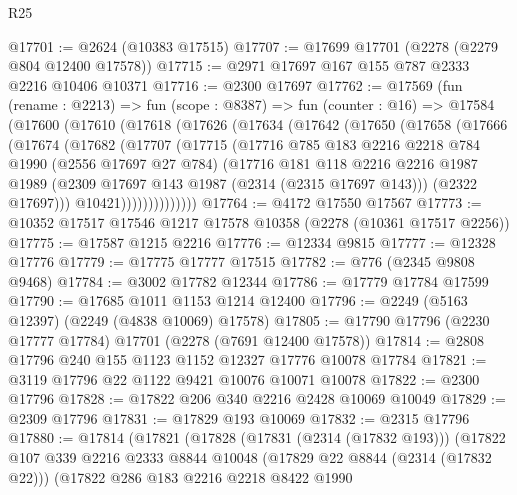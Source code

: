 \begin{lexlean}{R25}
\begin{coremodule}
@17701 := @2624 (@10383 @17515)
@17707 := @17699 @17701 (@2278 (@2279 @804 @12400 @17578))
@17715 := @2971 @17697 @167 @155 @787 @2333 @2216 @10406 @10371
@17716 := @2300 @17697
@17762 := @17569
    (fun (rename : @2213) =>
    fun (scope : @8387) =>
    fun (counter : @16) =>
    @17584
      (@17600
        (@17610
          (@17618
            (@17626
              (@17634
                (@17642
                  (@17650
                    (@17658
                      (@17666
                        (@17674
                          (@17682
                            (@17707
                              (@17715
                                (@17716
                                  @785
                                  @183
                                  @2216
                                  @2218
                                  @784
                                  @1990
                                  (@2556 @17697 @27 @784)
                                  (@17716
                                    @181
                                    @118
                                    @2216
                                    @2216
                                    @1987
                                    @1989
                                    (@2309 @17697 @143 @1987 (@2314 (@2315 @17697 @143)))
                                    (@2322 @17697)))
                                @10421))))))))))))))
@17764 := @4172 @17550 @17567
@17773 := @10352 @17517 @17546 @1217 @17578 @10358 (@2278 (@10361 @17517 @2256))
@17775 := @17587 @1215 @2216
@17776 := @12334 @9815
@17777 := @12328 @17776
@17779 := @17775 @17777 @17515
@17782 := @776 (@2345 @9808 @9468)
@17784 := @3002 @17782 @12344
@17786 := @17779 @17784 @17599
@17790 := @17685 @1011 @1153 @1214 @12400
@17796 := @2249 (@5163 @12397) (@2249 (@4838 @10069) @17578)
@17805 := @17790 @17796 (@2230 @17777 @17784) @17701 (@2278 (@7691 @12400 @17578))
@17814 := @2808 @17796 @240 @155 @1123 @1152 @12327 @17776 @10078 @17784
@17821 := @3119 @17796 @22 @1122 @9421 @10076 @10071 @10078
@17822 := @2300 @17796
@17828 := @17822 @206 @340 @2216 @2428 @10069 @10049
@17829 := @2309 @17796
@17831 := @17829 @193 @10069
@17832 := @2315 @17796
@17880 := @17814
    (@17821
      (@17828
        (@17831 (@2314 (@17832 @193)))
        (@17822
          @107
          @339
          @2216
          @2333
          @8844
          @10048
          (@17829 @22 @8844 (@2314 (@17832 @22)))
          (@17822
            @286
            @183
            @2216
            @2218
            @8422
            @1990

\end{coremodule}
\end{lexlean}
